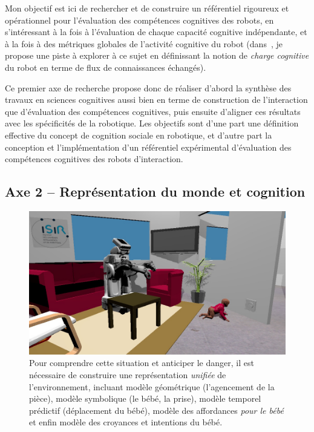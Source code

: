 \documentclass[a4paper]{article}
\begin{document}

Mon objectif est ici de rechercher et de construire un référentiel rigoureux et
opérationnel pour l'évaluation des compétences cognitives des robots, en
s'intéressant à la fois à l'évaluation de chaque capacité cognitive
indépendante, et à la fois à des métriques globales de l'activité cognitive du
robot (dans~\cite{lemaignan2013explicit}, je propose une piste à explorer à ce
sujet en définissant la notion de \emph{charge cognitive} du robot en terme de
flux de connaissances échangés).

Ce premier axe de recherche propose donc de réaliser d'abord la synthèse des
travaux en sciences cognitives aussi bien en terme de construction de
l'interaction que d'évaluation des compétences cognitives, puis ensuite
d'aligner ces résultats avec les spécificités de la robotique. Les objectifs
sont d'une part une définition effective du concept de cognition sociale en
robotique, et d'autre part la conception et l'implémentation d'un référentiel
expérimental d'évaluation des compétences cognitives des robots d'interaction.

\subsection{Axe 2 -- Représentation du monde et cognition}

\begin{figure}
\includegraphics[width=\textwidth]{figs/robots_home_baby_socket.jpg}
\caption{Pour comprendre cette situation et anticiper le danger, il est
    nécessaire de construire une représentation \emph{unifiée} de
    l'environnement, incluant modèle géométrique (l'agencement de la pièce), modèle
    symbolique (le bébé, la prise), modèle temporel prédictif (déplacement du
    bébé), modèle des affordances \emph{pour le bébé} et enfin modèle des
    croyances et intentions du bébé.}
\label{babyplug}
\end{figure}
\end{document}
